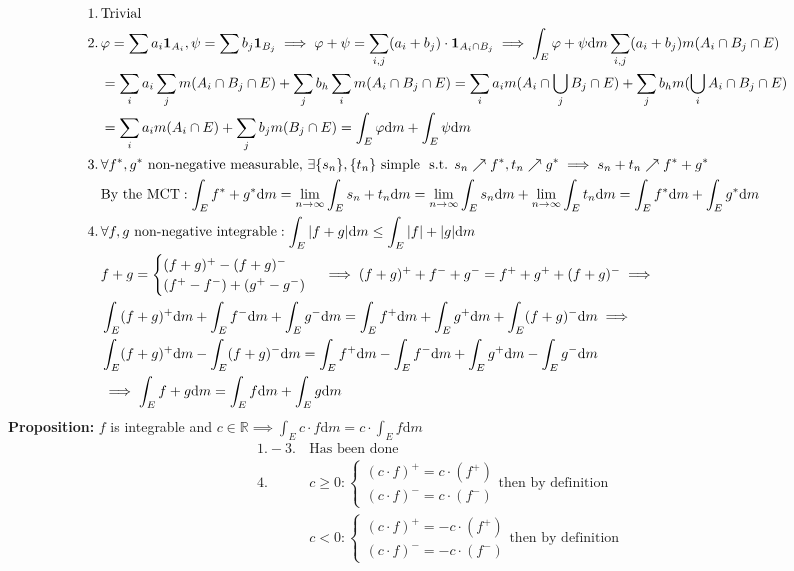 \documentclass{article}
\newcommand{\R}{\mathbb{R}}
\newcommand{\limninf}{\lim\limits_{n\to\infty}}
\newcommand{\st}{\mbox{ s.t. }}
\newcommand{\0}{{\bf{0}}}
\newcommand{\1}{{\bf{1}}}
\newcommand{\dint}{\displaystyle\int}
\newcommand{\dif}{\mbox{d}}
\newcommand{\incto}{\nearrow}
\begin{document}
\begin{equation}
\begin{split}
    1.\,&\mbox{Trivial}\\
    2.\,&\varphi=\sum a_i\1_{A_i},\psi=\sum b_j\1_{B_j}\implies\varphi+\psi=\sum_{i,j}(a_i+b_j)\cdot\1_{A_i\cap B_j}\implies\int_E\varphi+\psi\dif m\sum_{i,j}(a_i+b_j)m(A_i\cap B_j\cap E)\\
    &=\sum_ia_i\sum_jm(A_i\cap B_j\cap E)+\sum_jb_h\sum_im(A_i\cap B_j\cap E)=\sum_ia_im(A_i\cap\bigcup_jB_j\cap E)+\sum_jb_hm(\bigcup_iA_i\cap B_j\cap E)\\
    &=\sum_ia_im(A_i\cap E)+\sum_jb_jm(B_j\cap E)=\int_E\varphi\dif m+\int_E\psi\dif m\\
    3.\,&\forall f^*,g^*\mbox{ non-negative measurable, }\exists\{s_n\},\{t_n\}\mbox{ simple }\st s_n\incto f^*,t_n\incto g^*\implies s_n+t_n\incto f^*+g^*\\
    &\mbox{By the MCT}:\int_E f^*+g^*\dif m=\limninf\int_Es_n+t_n\dif m=\limninf\int_Es_n\dif m+\limninf\int_Et_n\dif m=\int_Ef^*\dif m+\int_Eg^*\dif m\\
    4.\,&\forall f,g\mbox{ non-negative integrable}:\int_E|f+g|\dif m\le\int_E|f|+|g|\dif m\\
    &f+g=\begin{cases}
        (f+g)^+-(f+g)^-\\
        (f^+-f^-)+(g^+-g^-)
    \end{cases}\implies(f+g)^++f^-+g^-=f^++g^++(f+g)^-\implies\\
    &\int_E(f+g)^+\dif m+\int_E f^-\dif m+\int_Eg^-\dif m=\int_Ef^+\dif m+\int_Eg^+\dif m+\int_E(f+g)^-\dif m\implies\\
    &\int_E(f+g)^+\dif m-\int_E(f+g)^-\dif m=\int_Ef^+\dif m-\int_Ef^-\dif m+\int_Eg^+\dif m-\int_Eg^-\dif m\\
    &\implies\int_Ef+g\dif m=\int_Ef\dif m+\int_Eg\dif m\\
\end{split}
\end{equation}
\textbf{Proposition:} $f$ is integrable and $c\in\R\implies\dint_Ec\cdot f\dif m=c\cdot\dint_Ef\dif m$
\begin{equation}
\begin{split}
    1.-3.\,&\mbox{Has been done}\\
    4.\,&c\geq0:\begin{cases}
        (c\cdot f)^+=c\cdot(f^+)\\
        (c\cdot f)^-=c\cdot(f^-)
    \end{cases}\mbox{then by definition}\\
    &c<0:\begin{cases}
        (c\cdot f)^+=-c\cdot(f^+)\\
        (c\cdot f)^-=-c\cdot(f^-)
    \end{cases}\mbox{then by definition}
\end{split}
\end{equation}
\end{document}
